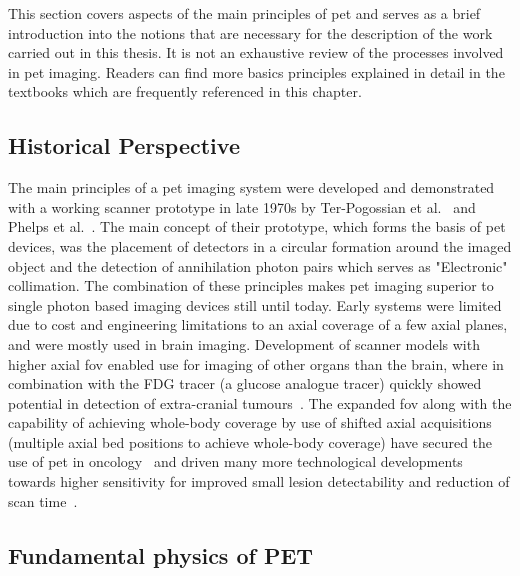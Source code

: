 This section covers aspects of the main principles of \gls{pet} and serves as a brief introduction into the notions that are necessary for the description of the work carried out in this thesis. It is not an exhaustive review of the processes involved in \gls{pet} imaging. Readers can find more basics principles explained in detail in the textbooks which are frequently referenced in this chapter.

\subsection{Historical Perspective}
The main principles of a \Gls{pet} imaging system were developed and demonstrated with a working scanner prototype in late 1970s by Ter-Pogossian et al.~\cite{Ter-Pogossian1975} and Phelps et al.~\cite{Phelps1975}. The main concept of their prototype, which forms the basis of \gls{pet} devices, was the placement of detectors in a circular formation around the imaged object and the detection of annihilation photon pairs which serves as "Electronic" collimation. The combination of these principles makes \gls{pet} imaging superior to single photon based imaging devices still until today. 
Early systems were limited due to cost and engineering limitations to an axial coverage of a few axial planes, and were mostly used in brain imaging. Development of scanner models with higher axial \gls{fov} enabled use for imaging of other organs than the brain, where in combination with the FDG tracer (a glucose analogue tracer) quickly showed potential in detection of extra-cranial tumours~\cite{Nutt2002}.
The expanded \gls{fov} along with the capability of achieving whole-body coverage by use of shifted axial acquisitions~\cite{Dahlbom1992} (multiple axial bed positions to achieve whole-body coverage) have secured the use of \gls{pet} in oncology~\cite{Bomanji2001} and driven many more technological developments towards higher sensitivity for  improved small lesion detectability and reduction of scan time~\cite{Jones2017}.


\subsection{Fundamental physics of PET}

